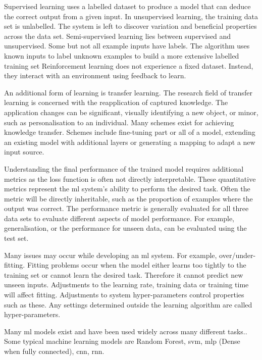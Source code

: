 Supervised learning uses a labelled dataset to produce a model that can deduce the correct output from a given input\cite{Burkov2019}. In unsupervised learning, the training data set is unlabelled. The system is left to discover variation and beneficial properties across the data set. Semi-supervised learning lies between supervised and unsupervised. Some but not all example inputs have labels. The algorithm uses known inputs to label unknown examples to build a more extensive labelled training set\cite{Abdallah2018} Reinforcement learning does not experience a fixed dataset. Instead, they interact with an environment using feedback to learn.

An additional form of learning is transfer learning. The research field of transfer learning is concerned with the reapplication of captured knowledge. The application changes can be significant, visually identifying a new object, or minor, such as personalisation to an individual. Many schemes exist for achieving knowledge transfer. Schemes include fine-tuning part or all of a model, extending an existing model with additional layers or generating a mapping to adapt a new input source.\cite{Farahani2020, Zhuang2021}

Understanding the final performance of the trained model requires additional metrics as the loss function is often not directly interpretable. These quantitative metrics represent the \acrshort{ml} system's ability to perform the desired task. Often the metric will be directly inheritable, such as the proportion of examples where the output was correct. The performance metric is generally evaluated for all three data sets to evaluate different aspects of model performance. For example, generalisation, or the performance for unseen data, can be evaluated using the test set.

Many issues may occur while developing an \acrshort{ml} system. For example, over/under-fitting. Fitting problems occur when the model either learns too tightly to the training set or cannot learn the desired task. Therefore it cannot predict new unseen inputs. Adjustments to the learning rate, training data or training time will affect fitting. Adjustments to system hyper-parameters control properties such as these. Any settings determined outside the learning algorithm are called hyper-parameters.\cite{Goodfellow2015}

Many \acrshort{ml} models exist and have been used widely across many different tasks.. Some typical machine learning models are Random Forest, \acrfull{svm}, \acrfull{mlp} (Dense when fully connected), \acrfull{cnn}, \acrfull{rnn}.

